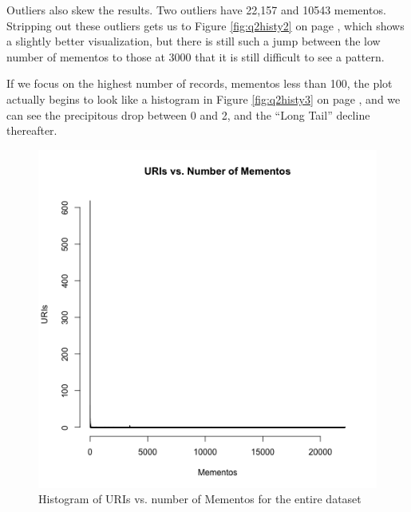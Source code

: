 \documentclass[letterpaper,11pt]{article}
\begin{document}
Outliers also skew the results.  Two outliers have 22,157 and 10543 mementos.  Stripping out these outliers gets us to Figure \ref{fig:q2histy2} on page \pageref{fig:q2histy2}, which shows a slightly better visualization, but there is still such a jump between the low number of mementos to those at 3000 that it is still difficult to see a pattern.

If we focus on the highest number of records, mementos less than 100, the plot actually begins to look like a histogram in Figure \ref{fig:q2histy3} on page \pageref{fig:q2histy3}, and we can see the precipitous drop between 0 and 2, and the ``Long Tail'' decline thereafter.

\begin{figure}
\includegraphics[scale=0.7]{work/q2/q2-histogram1.png}
\caption{Histogram of URIs vs. number of Mementos for the entire dataset}
\label{fig:q2histy1}
\end{figure}
\end{document}
